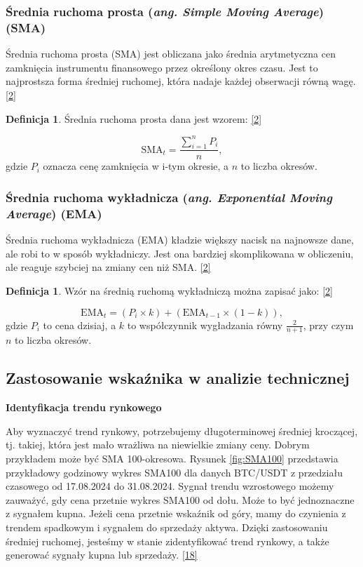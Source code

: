 \documentclass[12pt,a4paper,twoside, inzynierska]{pwr_wmat_praca_dyplomowa}
\theoremstyle{plain}
\numberwithin{theorem}{chapter}
\theoremstyle{definition}
\numberwithin{theorem}{chapter}
\newtheorem{definition}[theorem]{Definicja}
\begin{document}
	\subsubsection{Średnia ruchoma prosta (\textit{ang. Simple Moving Average}) (SMA)}
	
	Średnia ruchoma prosta (SMA) jest obliczana jako średnia arytmetyczna cen zamknięcia instrumentu finansowego przez określony okres czasu. Jest to najprostsza forma średniej ruchomej, która nadaje każdej obserwacji równą wagę.  \hyperref[info2]{[2]}
	\begin{definition}  Średnia ruchoma prosta dana jest wzorem: \hyperref[info2]{[2]}
	\end{definition}
	\begin{equation} 
		\text{SMA}_{t} = \frac{\sum_{i=1}^{n} P_i}{n},
		\label{eq:sma} %
	\end{equation}
	gdzie \( P_i \) oznacza cenę zamknięcia w i-tym okresie, a \( n \) to liczba okresów.
	
	\subsubsection{Średnia ruchoma wykładnicza (\textit{ang. Exponential Moving Average}) (EMA)}
	
	Średnia ruchoma wykładnicza (EMA) kładzie większy nacisk na najnowsze dane, ale robi to w sposób wykładniczy. Jest ona bardziej skomplikowana w obliczeniu, ale reaguje szybciej na zmiany cen niż SMA.
	\hyperref[info2]{[2]}
	\begin{definition} 
	Wzór na średnią ruchomą wykładniczą można zapisać jako: \hyperref[info2]{[2]}
	\end{definition}
	\begin{equation}
		\text{EMA}_{t} = (P_i \times k) + (\text{EMA}_{t-1} \times (1 - k)),
		\label{eq:EMA}
	\end{equation}
	gdzie \( P_i \) to cena dzisiaj, a \( k \) to współczynnik wygładzania równy \( \frac{2}{n+1} \), przy czym \( n \) to liczba okresów. 
	\newline
	\subsection{Zastosowanie wskaźnika w analizie technicznej}
	
	
	\noindent \textbf{Identyfikacja trendu rynkowego}
	
	 Aby wyznaczyć trend rynkowy, potrzebujemy długoterminowej średniej kroczącej, tj. takiej, która jest mało wrażliwa na niewielkie zmiany ceny. Dobrym przykładem może być SMA 100-okresowa. Rysunek \ref{fig:SMA100} przedstawia przykładowy godzinowy wykres SMA100 dla danych BTC/USDT z przedziału czasowego od 17.08.2024 do 31.08.2024. Sygnał trendu wzrostowego możemy zauważyć, gdy cena przetnie wykres SMA100 od dołu. Może to być jednoznaczne z sygnałem kupna. Jeżeli cena przetnie wskaźnik od góry, mamy do czynienia z trendem spadkowym i sygnałem do sprzedaży aktywa. Dzięki zastosowaniu  średniej ruchomej, jesteśmy w stanie zidentyfikować trend rynkowy, a także generować sygnały kupna lub sprzedaży. \hyperref[info18]{[18]}
	
\end{document}

